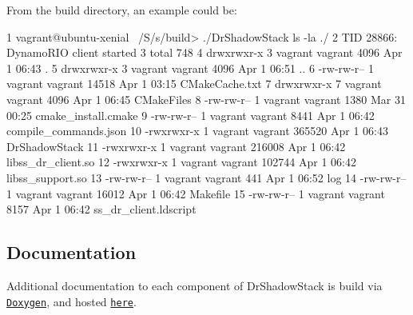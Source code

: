 From the build directory, an example could be\+: 
\begin{DoxyCode}
1 vagrant@ubuntu-xenial ~/S/s/build> ./DrShadowStack ls -la ./
2 TID 28866: DynamoRIO client started
3 total 748
4 drwxrwxr-x 3 vagrant vagrant   4096 Apr  1 06:43 .
5 drwxrwxr-x 3 vagrant vagrant   4096 Apr  1 06:51 ..
6 -rw-rw-r-- 1 vagrant vagrant  14518 Apr  1 03:15 CMakeCache.txt
7 drwxrwxr-x 7 vagrant vagrant   4096 Apr  1 06:45 CMakeFiles
8 -rw-rw-r-- 1 vagrant vagrant   1380 Mar 31 00:25 cmake\_install.cmake
9 -rw-rw-r-- 1 vagrant vagrant   8441 Apr  1 06:42 compile\_commands.json
10 -rwxrwxr-x 1 vagrant vagrant 365520 Apr  1 06:43 DrShadowStack
11 -rwxrwxr-x 1 vagrant vagrant 216008 Apr  1 06:42 libss\_dr\_client.so
12 -rwxrwxr-x 1 vagrant vagrant 102744 Apr  1 06:42 libss\_support.so
13 -rw-rw-r-- 1 vagrant vagrant    441 Apr  1 06:52 log
14 -rw-rw-r-- 1 vagrant vagrant  16012 Apr  1 06:42 Makefile
15 -rw-rw-r-- 1 vagrant vagrant   8157 Apr  1 06:42 ss\_dr\_client.ldscript
\end{DoxyCode}


\subsection*{Documentation}

Additional documentation to each component of Dr\+Shadow\+Stack is build via \href{http://www.stack.nl/~dimitri/doxygen/}{\tt Doxygen}, and hosted \href{https://zwimer.com/DrShadowStack}{\tt here}. 